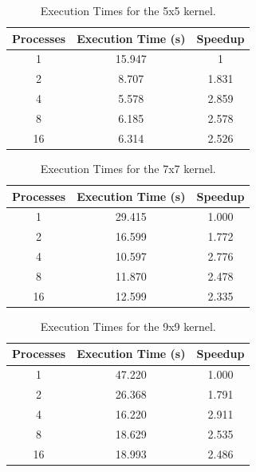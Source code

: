 \documentclass[10pt,twocolumn,letterpaper]{article}
\begin{document}
\begin{table}[H]
	\begin{center}
		\begin{tabular}{|c|c|c|}
			\hline
			Processes & Execution Time (s) & Speedup \\
			\hline
			1 & 15.947 & 1 \\
			2 & 8.707 & 1.831 \\
			4 & 5.578 & 2.859 \\
			8 & 6.185 & 2.578 \\
			16 & 6.314 & 2.526 \\
			\hline
		\end{tabular}
	\end{center}
	\caption{Execution Times for the 5x5 kernel.}
	\label{tab:speedup_k_2}
\end{table}

\begin{table}[H]
	\begin{center}
		\begin{tabular}{|c|c|c|}
			\hline
			Processes & Execution Time (s) & Speedup \\
			\hline
			1 & 29.415 & 1.000 \\
			2 & 16.599 & 1.772 \\
			4 & 10.597 & 2.776 \\
			8 & 11.870 & 2.478 \\
			16 & 12.599 & 2.335 \\
			\hline
		\end{tabular}
	\end{center}
	\caption{Execution Times for the 7x7 kernel.}
	\label{tab:speedup_k_3}
\end{table}

\begin{table}[H]
	\begin{center}
		\begin{tabular}{|c|c|c|}
			\hline
			Processes & Execution Time (s) & Speedup \\
			\hline
			1 & 47.220 & 1.000 \\
			2 & 26.368 & 1.791 \\
			4 & 16.220 & 2.911 \\
			8 & 18.629 & 2.535 \\
			16 & 18.993 & 2.486 \\
			\hline
		\end{tabular}
	\end{center}
	\caption{Execution Times for the 9x9 kernel.}
	\label{tab:speedup_k_4}
\end{table}
\end{document}
